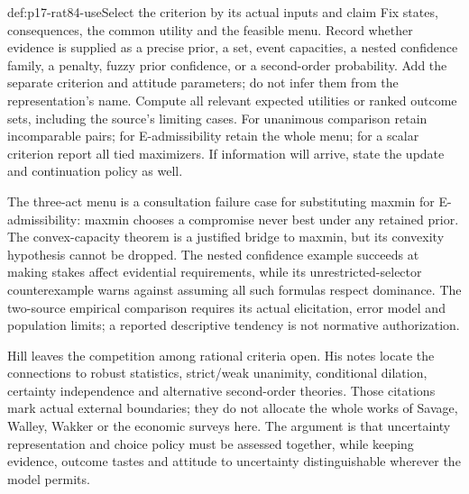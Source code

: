 \begin{hbmethod}{def:p17-rat84-use}{Select the criterion by its actual inputs and claim}
Fix states, consequences, the common utility and the feasible menu.
Record whether evidence is supplied as a precise prior, a set, event
capacities, a nested confidence family, a penalty, fuzzy prior confidence,
or a second-order probability. Add the separate criterion and attitude
parameters; do not infer them from the representation's name.
Compute all relevant expected utilities or ranked outcome sets, including
the source's limiting cases. For unanimous comparison retain incomparable
pairs; for E-admissibility retain the whole menu; for a scalar criterion
report all tied maximizers. If information will arrive, state the update
and continuation policy as well.

The three-act menu is a consultation failure case for substituting
maxmin for E-admissibility: maxmin chooses a compromise never best under
any retained prior. The convex-capacity theorem is a justified bridge
to maxmin, but its convexity hypothesis cannot be dropped. The nested
confidence example succeeds at making stakes affect evidential requirements,
while its unrestricted-selector counterexample warns against assuming
all such formulas respect dominance. The two-source empirical comparison
requires its actual elicitation, error model and population limits; a
reported descriptive tendency is not normative authorization.
\end{hbmethod}

Hill leaves the competition among rational criteria open. His notes locate
the connections to robust statistics, strict/weak unanimity, conditional
dilation, certainty independence and alternative second-order theories.
Those citations mark actual external boundaries; they do not allocate
the whole works of Savage, Walley, Wakker or the economic surveys here.
The argument is that uncertainty representation and choice policy must
be assessed together, while keeping evidence, outcome tastes and attitude
to uncertainty distinguishable wherever the model permits.
